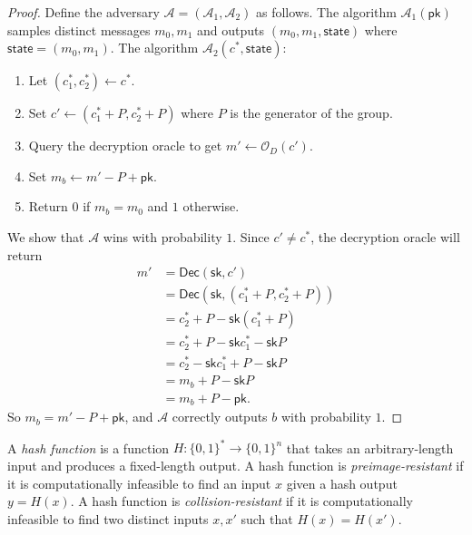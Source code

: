 \begin{proof}
    Define the adversary \(\mathcal{A} = (\mathcal{A}_1, \mathcal{A}_2)\) as follows.
    The algorithm \(\mathcal{A}_1(\mathsf{pk})\) samples distinct messages \(m_0, m_1\) and outputs \((m_0, m_1, \mathsf{state})\) where \(\mathsf{state} = (m_0, m_1)\).
    The algorithm \(\mathcal{A}_2(c^*, \mathsf{state})\):
    \begin{enumerate}
        \item Let \((c_1^*, c_2^*) \gets c^*\).
        \item Set \(c' \gets (c_1^* + P, c_2^* + P)\) where \(P\) is the generator of the group.
        \item Query the decryption oracle to get \(m' \gets \mathcal{O}_D(c')\).
        \item Set \(m_b \gets m' - P + \mathsf{pk}\).
        \item Return \(0\) if \(m_b = m_0\) and \(1\) otherwise.
    \end{enumerate}

    We show that \(\mathcal{A}\) wins with probability \(1\).
    Since \(c' \neq c^*\), the decryption oracle will return 
    \begin{align*}
        m' &= \mathsf{Dec}(\mathsf{sk}, c') \\
        &= \mathsf{Dec}(\mathsf{sk}, (c_1^* + P, c_2^* + P)) \\
        &= c_2^* + P - \mathsf{sk}(c_1^* + P) \\
        &= c_2^* + P - \mathsf{sk}c_1^* - \mathsf{sk}P \\
        &= c_2^* - \mathsf{sk}c_1^* + P - \mathsf{sk}P \\
        &= m_b + P - \mathsf{sk}P \\
        &= m_b + P - \mathsf{pk}.
    \end{align*}
    So \(m_b = m' - P + \mathsf{pk}\), and \(\mathcal{A}\) correctly outputs \(b\) with probability \(1\).
\end{proof}

\begin{definition}
    A \emph{hash function} is a function \(H: \{0, 1\}^* \to \{0, 1\}^n\) that takes an arbitrary-length input and produces a fixed-length output.
    A hash function is \emph{preimage-resistant} if it is computationally infeasible to find an input \(x\) given a hash output \(y = H(x)\).
    A hash function is \emph{collision-resistant} if it is computationally infeasible to find two distinct inputs \(x, x'\) such that \(H(x) = H(x')\).
\end{definition}

